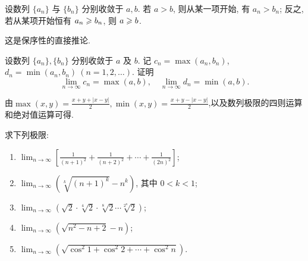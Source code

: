 \begin{exercise}[1.2.13]
    设数列 $\{a_n\}$ 与 $\{b_n\}$ 分别收敛于 $a, b$. 若 $a > b$, 则从某一项开始, 有 $a_n > b_n$; 反之, 若从某项开始恒有 $a_n \geqslant b_n$, 则 $a \geqslant b$.
\end{exercise}

\begin{solution}
这是保序性的直接推论.
\end{solution}

\begin{exercise}[1.2.14]
    设数列 $\{a_n\}, \{b_n\}$ 分别收敛于 $a$ 及 $b$. 记 $c_n = \max(a_n, b_n)$, $d_n = \min(a_n, b_n) \ (n=1, 2, \ldots)$. 证明
    $$
        \lim_{n\to\infty} c_n = \max(a, b), \quad \lim_{n\to\infty} d_n = \min(a, b).
    $$
\end{exercise}

\begin{solution}
    由$\max(x,y) = \frac{x+y+|x-y|}{2}, \min(x,y) = \frac{x+y-|x-y|}{2}$,以及数列极限的四则运算和绝对值运算可得.
\end{solution}

\begin{exercise}[1.2.15]
    求下列极限:
    \begin{enumerate}[(1)]
        \item $\lim_{n\to\infty} \left[\frac{1}{(n+1)^2} + \frac{1}{(n+2)^2} + \cdots + \frac{1}{(2n)^2}\right]$;
        \item $\lim_{n\to\infty} (\sqrt[k]{(n+1)^k} - n^k)$, 其中 $0 < k < 1$;
        \item $\lim_{n\to\infty} (\sqrt{2} \cdot \sqrt[4]{2} \cdot \sqrt[8]{2} \cdots \sqrt[2^n]{2})$;
        \item $\lim_{n\to\infty} \left(\sqrt{n^2 - n + 2} - n\right)$;
        \item $\lim_{n\to\infty} \left(\sqrt{\cos^2 1 + \cos^2 2 + \cdots + \cos^2 n}\right)$.
    \end{enumerate}
\end{exercise}

